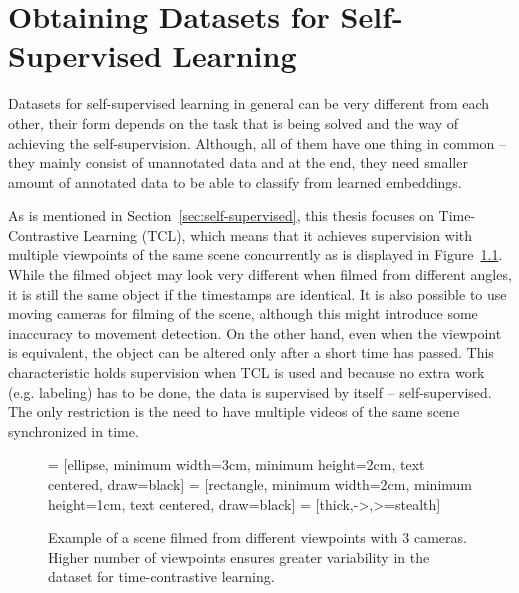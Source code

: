 \chapter{\label{chap:dataset}Obtaining Datasets for Self-Supervised Learning}

Datasets for self-supervised learning in general can be very different from each other, their form depends on the task that is being solved and the way of achieving the self-supervision. Although, all of them have one thing in common -- they mainly consist of unannotated data and at the end, they need smaller amount of annotated data to be able to classify from learned embeddings.

As is mentioned in Section~\ref{sec:self-supervised}, this thesis focuses on Time-Contrastive Learning (TCL), which means that it achieves supervision with multiple viewpoints of the same scene concurrently as is displayed in Figure~\ref{fig:scene-multiple-cameras}. While the filmed object may look very different when filmed from different angles, it is still the same object if the timestamps are identical. It is also possible to use moving cameras for filming of the scene, although this might introduce some inaccuracy to movement detection. On the other hand, even when the viewpoint is equivalent, the object can be altered only after a short time has passed. This characteristic holds supervision when TCL is used and because no extra work (e.g. labeling) has to be done, the data is supervised by itself -- self-supervised. The only restriction is the need to have multiple videos of the same scene synchronized in time.

\begin{figure}[ht!]
    \centering

     = [ellipse, minimum width=3cm, minimum height=2cm, text centered, draw=black]
     = [rectangle, minimum width=2cm, minimum height=1cm, text centered, draw=black]
     = [thick,->,>=stealth]

    
    \caption{Example of a scene filmed from different viewpoints with 3 cameras. Higher number of viewpoints ensures greater variability in the dataset for time-contrastive learning.}
    \label{fig:scene-multiple-cameras}
\end{figure}

